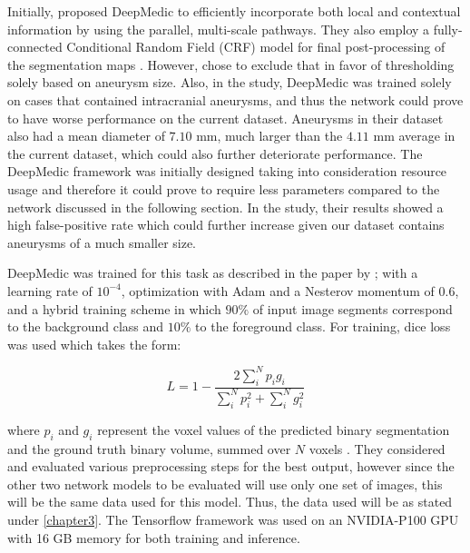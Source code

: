 
Initially, \citeauthor{Kamnitsas2017} proposed DeepMedic to efficiently incorporate both local and contextual information by using the parallel, multi-scale pathways. They also employ a fully-connected Conditional Random Field (CRF) model for final post-processing of the segmentation maps \cite{Krahenbuhl2012}. However, \citeauthor{Sichermann2019} chose to exclude that in favor of thresholding solely based on aneurysm size. Also, in the study, DeepMedic was trained solely on cases that contained intracranial aneurysms, and thus the network could prove to have worse performance on the current dataset. Aneurysms in their dataset also had a mean diameter of $7.10$ mm, much larger than the $4.11$ mm average in the current dataset, which could also further deteriorate performance. The DeepMedic framework was initially designed taking into consideration resource usage and therefore it could prove to require less parameters compared to the network discussed in the following section. In the study, their results showed a high false-positive rate which could further increase given our dataset contains aneurysms of a much smaller size.

DeepMedic was trained for this task as described in the paper by \citeauthor{Sichermann2019}; with a learning rate of $10^{-4}$, optimization with Adam and a Nesterov momentum of $0.6$, and a hybrid training scheme in which $90\%$ of input image segments correspond to the background class and $10\%$ to the foreground class. For training, dice loss was used which takes the form:

 \[L = 1 - \frac{2\sum_{i}^{N}p_{i}g_{i}}{\sum_{i}^{N}p_{i}^{2} + \sum_{i}^{N}g_{i}^{2}} \]

where $p_{i}$ and $g_{i}$ represent the voxel values of the predicted binary segmentation and the ground truth binary volume, summed over $N$ voxels \cite{milletari2016v}. They considered and evaluated various preprocessing steps for the best output, however since the other two network models to be evaluated will use only one set of images, this will be the same data used for this model. Thus, the data used will be as stated under \ref{chapter3}. The Tensorflow framework was used on an NVIDIA-P100 GPU with 16 GB memory for both training and inference. 

